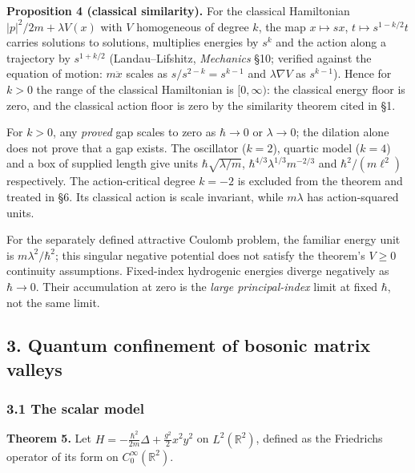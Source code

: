 \documentclass[11pt,a4paper]{article}
\begin{document}
\textbf{Proposition 4 (classical similarity).} For the classical
Hamiltonian \(|p|^2/2m+\lambda V(x)\) with \(V\) homogeneous of degree
\(k\), the map \(x\mapsto sx\), \(t\mapsto s^{1-k/2}t\) carries
solutions to solutions, multiplies energies by \(s^k\) and the action
along a trajectory by \(s^{1+k/2}\) (Landau--Lifshitz, \emph{Mechanics}
§10; verified against the equation of motion: \(m\ddot x\) scales as
\(s/s^{2-k}=s^{k-1}\) and \(\lambda\nabla V\) as \(s^{k-1}\)). Hence for
\(k>0\) the range of the classical Hamiltonian is \([0,\infty)\): the
classical energy floor is zero, and the classical action floor is zero
by the similarity theorem cited in §1.

For \(k>0\), any \emph{proved} gap scales to zero as \(\hbar\to0\) or
\(\lambda\to0\); the dilation alone does not prove that a gap exists.
The oscillator (\(k=2\)), quartic model (\(k=4\)) and a box of supplied
length give units \(\hbar\sqrt{\lambda/m}\),
\(\hbar^{4/3}\lambda^{1/3}m^{-2/3}\) and \(\hbar^2/(m\ell^2)\)
respectively. The action-critical degree \(k=-2\) is excluded from the
theorem and treated in §6. Its classical action is scale invariant,
while \(m\lambda\) has action-squared units.

For the separately defined attractive Coulomb problem, the familiar
energy unit is \(m\lambda^2/\hbar^2\); this singular negative potential
does not satisfy the theorem's \(V\ge0\) continuity assumptions.
Fixed-index hydrogenic energies diverge negatively as \(\hbar\to0\).
Their accumulation at zero is the \emph{large principal-index} limit at
fixed \(\hbar\), not the same limit.

\hypertarget{quantum-confinement-of-bosonic-matrix-valleys}{%
\subsection{3. Quantum confinement of bosonic matrix
valleys}\label{quantum-confinement-of-bosonic-matrix-valleys}}

\hypertarget{the-scalar-model}{%
\subsubsection{3.1 The scalar model}\label{the-scalar-model}}

\textbf{Theorem 5.} Let
\(H=-\frac{\hbar^2}{2m}\Delta+\frac{g^2}{2}x^2y^2\) on
\(L^2(\mathbb R^2)\), defined as the Friedrichs operator of its form on
\(C_0^\infty(\mathbb R^2)\).
\end{document}
